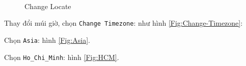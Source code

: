 \documentclass[12pt,a4paper]{article}
\begin{document}
\begin{list}{--}{}
		\begin{figure}[!h]
			\begin{center}
				\\
			\end{center}
			\caption{Change Locate}
		\end{figure}
		
		\item Thay đổi múi giờ, chọn \verb|Change Timezone|: như hình \ref{Fig:Change-Timezone}:
			\begin{list}{+}{}
				\item Chọn \verb|Asia|: hình \ref{Fig:Asia}.
				
				\item Chọn \verb|Ho_Chi_Minh|: hình \ref{Fig:HCM}.
			\end{list}
			

\end{list}
\end{document}
